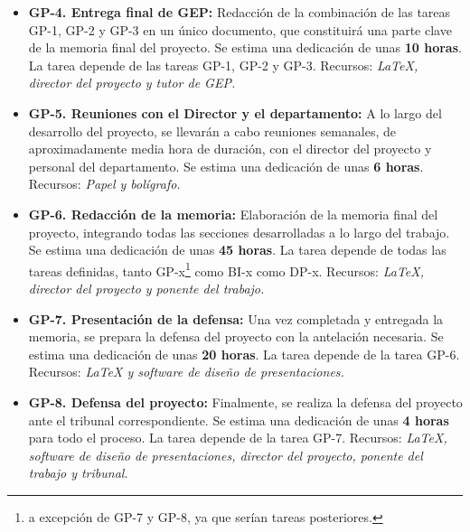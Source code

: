 \begin{itemize}
    \item \textbf{GP-4. Entrega final de GEP:} Redacción de la combinación de las tareas GP-1, GP-2 y GP-3 en un único documento, 
    que constituirá una parte clave de la memoria final del proyecto. Se estima una dedicación de unas \textbf{10 horas}. 
    \newline La tarea depende de las tareas GP-1, GP-2 y GP-3.
    \newline Recursos: \textit {LaTeX, director del proyecto y tutor de GEP.}
    
    \item \textbf{GP-5. Reuniones con el Director y el departamento:} A lo largo del desarrollo del proyecto, se llevarán 
    a cabo reuniones semanales, de aproximadamente media hora de duración, con el director del proyecto y personal del 
    departamento. Se estima una dedicación de unas \textbf{6 horas}. 
    \newline Recursos: \textit {Papel y bolígrafo.}
    
    \item \textbf{GP-6. Redacción de la memoria:} Elaboración de la memoria final del proyecto, integrando todas las secciones
    desarrolladas a lo largo del trabajo. Se estima una dedicación de unas \textbf{45 horas}.
    \newline La tarea depende de todas las tareas definidas, tanto GP-x\footnote{a excepción de GP-7 y GP-8, ya que serían tareas 
    posteriores.} como BI-x como DP-x.
    \newline Recursos: \textit {LaTeX, director del proyecto y ponente del trabajo.}
    
    \item \textbf{GP-7. Presentación de la defensa:} Una vez completada y entregada la memoria, se prepara la defensa del proyecto 
    con la antelación necesaria. Se estima una dedicación de unas \textbf{20 horas}.
    \newline La tarea depende de la tarea GP-6.
    \newline Recursos: \textit {LaTeX y software de diseño de presentaciones.}
    
    \item \textbf{GP-8. Defensa del proyecto:}
    Finalmente, se realiza la defensa del proyecto ante el tribunal correspondiente. Se estima una dedicación de unas \textbf{4 horas} 
    para todo el proceso.
    \newline La tarea depende de la tarea GP-7.
    \newline Recursos: \textit {LaTeX, software de diseño de presentaciones, director del proyecto, ponente del trabajo y tribunal.}
\end{itemize}